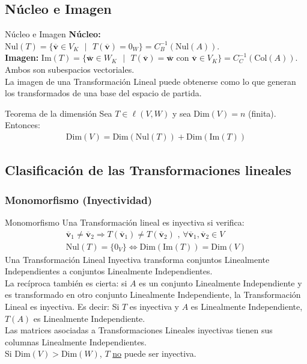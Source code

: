 \documentclass[a4paper, twoside]{article}
\numberwithin{equation}{section}
\numberwithin{figure}{section}
\numberwithin{table}{section}
\newcommand{\vect}[1]{\overline{\textbf{#1}}}
\newcommand{\col}[1]{\text{Col}(#1)}
\newcommand{\nul}[1]{\text{Nul}(#1)}
\newcommand{\im}[1]{\text{Im}(#1)}
\newcommand{\dime}[1]{\text{Dim}(#1)}
\begin{document}
\subsection{Núcleo e Imagen}
\begin{definicion*}{Núcleo e Imagen}
	\textbf{Núcleo:} $\nul{T}=\{ \vect{v} \in V_K \text{ } \vert \text{ } T(\vect{v})=0_W \}=C_B^{-1}(\nul{A})$.\\
	\textbf{Imagen:} $\im{T}=\{ \vect{w} \in W_K \text{ } \vert \text{ } T(\vect{v})=\vect{w} \text{ con } \vect{v} \in V_K \}=C_C^{-1}(\col{A})$.\\
	
	Ambos son subespacios vectoriales.\\
	
	La imagen de una Transformación Lineal puede obtenerse como lo que generan los transformados de una base del espacio de partida.
\end{definicion*}

\begin{teorema*}{Teorema de la dimensión}
	Sea $T \in \ell (V,W)$ y sea $\dime{V}=n$ (finita). Entonces:
	\begin{align}
		\dime{V}=\dime{\nul{T}}+\dime{\im{T}}
	\end{align}
\end{teorema*}

\subsection{Clasificación de las Transformaciones lineales}
\subsubsection{Monomorfismo (Inyectividad)}
\begin{definicion*}{Monomorfismo}
	Una Transformación lineal es inyectiva si verifica:
	\begin{align}
		\vect{v}_1 \neq \vect{v}_2 \Rightarrow T(\vect{v}_1) \neq T(\vect{v}_2) \text{ , } \forall \vect{v}_1,\vect{v}_2 \in V \\
		\nul{T}=\{0_V\} \Longleftrightarrow \dime{\im{T}}=\dime{V}
	\end{align}
	Una Transformación Lineal Inyectiva transforma conjuntos Linealmente Independientes a conjuntos Linealmente Independientes.\\
	
	La recíproca también es cierta: si $A$ es un conjunto Linealmente Independiente y es transformado en otro conjunto Linealmente Independiente, la Transformación Lineal es inyectiva. Es decir: Si $T$ es inyectiva y $A$ es Linealmente Independiente, $T(A)$ es Linealmente Independiente.\\
	
	Las matrices asociadas a Transformaciones Lineales inyectivas tienen sus columnas Linealmente Independientes.\\
	
	Si $\dime{V} > \dime{W}$, $T$ \underline{no} puede ser inyectiva.
\end{definicion*}
\end{document}
